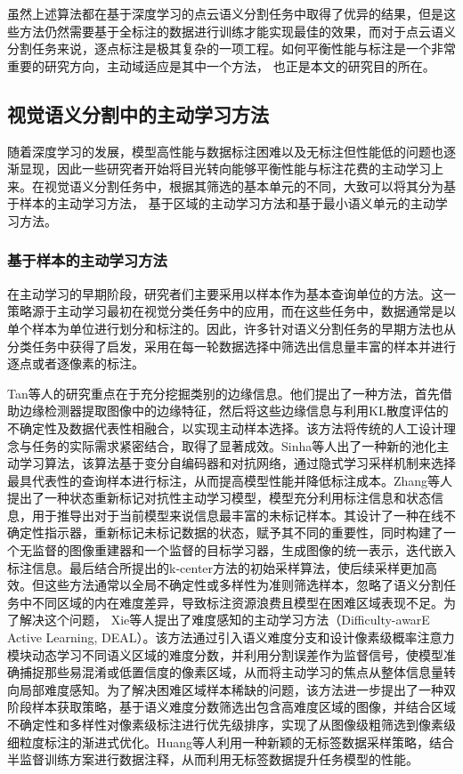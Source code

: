 虽然上述算法都在基于深度学习的点云语义分割任务中取得了优异的结果，但是这些方法仍然需要基于全标注的数据进行训练才能实现最佳的效果，而对于点云语义分割任务来说，逐点标注是极其复杂的一项工程。如何平衡性能与标注是一个非常重要的研究方向，主动域适应是其中一个方法， 也正是本文的研究目的所在。

\subsection{视觉语义分割中的主动学习方法}
随着深度学习的发展，模型高性能与数据标注困难以及无标注但性能低的问题也逐渐显现，因此一些研究者开始将目光转向能够平衡性能与标注花费的主动学习上来。在视觉语义分割任务中，根据其筛选的基本单元的不同，大致可以将其分为基于样本的主动学习方法， 基于区域的主动学习方法和基于最小语义单元的主动学习方法。
\subsubsection{基于样本的主动学习方法}
在主动学习的早期阶段，研究者们主要采用以样本作为基本查询单位的方法。这一策略源于主动学习最初在视觉分类任务中的应用，而在这些任务中，数据通常是以单个样本为单位进行划分和标注的。因此，许多针对语义分割任务的早期方法也从分类任务中获得了启发，采用在每一轮数据选择中筛选出信息量丰富的样本并进行逐点或者逐像素的标注。

Tan等人的研究重点在于充分挖掘类别的边缘信息。他们提出了一种方法，首先借助边缘检测器提取图像中的边缘特征，然后将这些边缘信息与利用KL散度评估的不确定性及数据代表性相融合，以实现主动样本选择。该方法将传统的人工设计理念与任务的实际需求紧密结合，取得了显著成效。Sinha等人出了一种新的池化主动学习算法，该算法基于变分自编码器和对抗网络，通过隐式学习采样机制来选择最具代表性的查询样本进行标注，从而提高模型性能并降低标注成本。Zhang等人提出了一种状态重新标记对抗性主动学习模型，模型充分利用标注信息和状态信息，用于推导出对于当前模型来说信息最丰富的未标记样本。其设计了一种在线不确定性指示器，重新标记未标记数据的状态，赋予其不同的重要性，同时构建了一个无监督的图像重建器和一个监督的目标学习器，生成图像的统一表示，迭代嵌入标注信息。最后结合所提出的k-center方法的初始采样算法，使后续采样更加高效。但这些方法通常以全局不确定性或多样性为准则筛选样本，忽略了语义分割任务中不同区域的内在难度差异，导致标注资源浪费且模型在困难区域表现不足。为了解决这个问题， Xie等人提出了难度感知的主动学习方法（Difficulty-awarE Active Learning, DEAL）。该方法通过引入语义难度分支和设计像素级概率注意力模块动态学习不同语义区域的难度分数，并利用分割误差作为监督信号，使模型准确捕捉那些易混淆或低置信度的像素区域，从而将主动学习的焦点从整体信息量转向局部难度感知。为了解决困难区域样本稀缺的问题，该方法进一步提出了一种双阶段样本获取策略，基于语义难度分数筛选出包含高难度区域的图像，并结合区域不确定性和多样性对像素级标注进行优先级排序，实现了从图像级粗筛选到像素级细粒度标注的渐进式优化。Huang等人利用一种新颖的无标签数据采样策略，结合半监督训练方案进行数据注释，从而利用无标签数据提升任务模型的性能。

